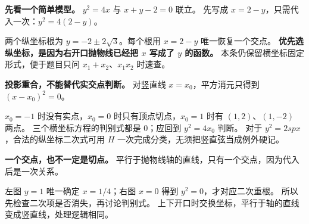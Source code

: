 \begin{explanationbox}
\textbf{先看一个简单模型。} $y^2=4x$ 与 $x+y-2=0$ 联立。
先写成 $x=2-y$，只需代入一次：$y^2=4(2-y)$。

两个纵坐标根为 $y=-2\pm2\sqrt3$。每个根用 $x=2-y$ 唯一恢复一个交点。
\textbf{优先选纵坐标，是因为右开口抛物线已经把 $x$ 写成了 $y$ 的函数。}
本条仍保留横坐标固定形式，便于题目只问 $x_1+x_2$、$x_1x_2$ 时速查。
\end{explanationbox}
\clearpage
\begin{explanationbox}
\textbf{投影重合，不能替代实交点判断。}
对竖直线 $x=x_0$，平方消元只得到 $(x-x_0)^2=0$。

$x_0=-1$ 时没有实点，$x_0=0$ 时只有顶点切点，$x_0=1$ 时有 $(1,2)$、$(1,-2)$ 两点。
三个横坐标方程的判别式都是 $0$；应回到 $y^2=4x_0$ 判断。
对于 $y^2=2spx$，合法的纵坐标二次式可用 $H$ 一次完成分类，无须把竖直弦当成例外硬记。
\end{explanationbox}
\clearpage
\begin{explanationbox}
\textbf{一个交点，也不一定是切点。}
平行于抛物线轴的直线，只有一个交点，因为代入后是一次关系。

左图 $y=1$ 唯一确定 $x=1/4$；右图 $x=0$ 得到 $y^2=0$，才对应二次重根。
所以先检查二次项是否消失，再讨论判别式。
上下开口时交换坐标，平行于轴的直线变成竖直线，处理逻辑相同。
\end{explanationbox}
\clearpage
